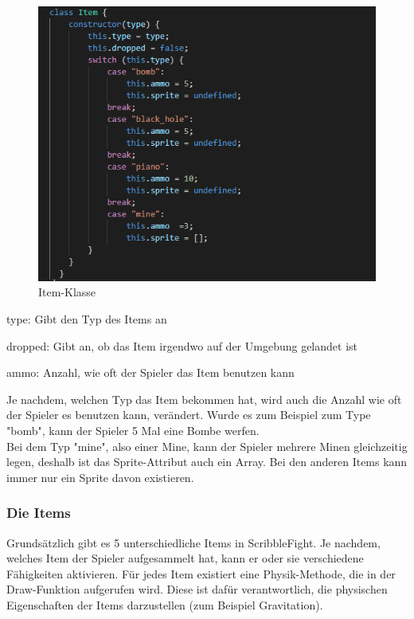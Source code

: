 \begin{figure}[H]
    \centering
    \includegraphics[scale=1]{pics/itemClass.PNG}
    \caption{Item-Klasse}
\end{figure}

\begin{compactitem}
    \item type: Gibt den Typ des Items an
    \item dropped: Gibt an, ob das Item irgendwo auf der Umgebung gelandet ist
    \item ammo: Anzahl, wie oft der Spieler das Item benutzen kann
\end{compactitem}

Je nachdem, welchen Typ das Item bekommen hat, wird auch die Anzahl wie oft
der Spieler es benutzen kann, verändert.
Wurde es zum Beispiel zum Type "bomb", kann der Spieler 5 Mal eine Bombe werfen.
\\
Bei dem Typ "mine", also einer Mine, kann der Spieler mehrere Minen gleichzeitig legen, deshalb ist das Sprite-Attribut auch ein Array.
Bei den anderen Items kann immer nur ein Sprite davon existieren.




\subsubsection{Die Items}  \label{impl:items}
Grundsätzlich gibt es 5 unterschiedliche Items in ScribbleFight. Je nachdem, welches Item der Spieler aufgesammelt hat, kann er oder sie verschiedene Fähigkeiten aktivieren.
Für jedes Item existiert eine Physik-Methode, die in der Draw-Funktion aufgerufen wird. Diese ist dafür verantwortlich, die physischen Eigenschaften der Items darzustellen (zum Beispiel Gravitation).

